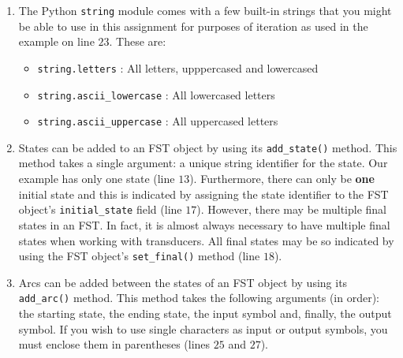 \documentclass[11pt]{article}
\begin{document}
\begin{enumerate}
	\item The Python \texttt{string} module comes with a few
          built-in strings that you might be able to use in this
          assignment for purposes of iteration as used in the example
          on line $23$. These are:
	\begin{itemize}
		\item \texttt{string.letters} : All letters, upppercased and lowercased
		\item \texttt{string.ascii\_lowercase} : All lowercased letters
		\item \texttt{string.ascii\_uppercase} : All uppercased letters
	\end{itemize}
	\item States can be added to an FST object by using its
          \texttt{add\_state()} method. This method takes a single
          argument: a unique string identifier for the state. Our
          example has only one state (line $13$). Furthermore, there
          can only be \textbf{one} initial state and this is indicated
          by assigning the state identifier to the FST object's
          \texttt{initial\_state} field (line $17$). However, there
          may be multiple final states in an FST. In fact, it is
          almost always necessary to have multiple final states when
          working with transducers. All final states may be so
          indicated by using the FST object's \texttt{set\_final()}
          method (line $18$).
	\item Arcs can be added between the states of an FST object by
          using its \texttt{add\_arc()} method. This method takes the
          following arguments (in order): the starting state, the
          ending state, the input symbol and, finally, the output
          symbol. If you wish to use single characters as input or
          output symbols, you must enclose them in parentheses (lines
          $25$ and $27$).  \\


\end{enumerate}
\end{document}
